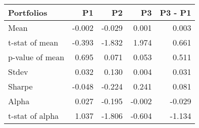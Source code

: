 \begin{tabular}{lrrrr}
\toprule
Portfolios & P1 & P2 & P3 & P3 - P1 \\
\midrule
Mean & -0.002 & -0.029 & 0.001 & 0.003 \\
t-stat of mean & -0.393 & -1.832 & 1.974 & 0.661 \\
p-value of mean & 0.695 & 0.071 & 0.053 & 0.511 \\
Stdev & 0.032 & 0.130 & 0.004 & 0.031 \\
Sharpe & -0.048 & -0.224 & 0.241 & 0.081 \\
Alpha & 0.027 & -0.195 & -0.002 & -0.029 \\
t-stat of alpha & 1.037 & -1.806 & -0.604 & -1.134 \\
\bottomrule
\end{tabular}
